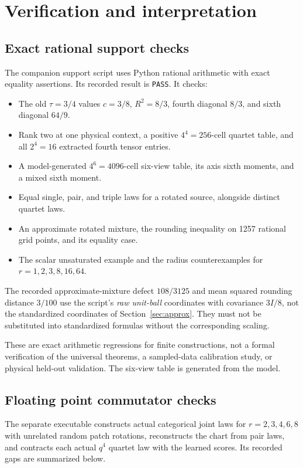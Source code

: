 \documentclass[11pt]{article}
\theoremstyle{definition}
\theoremstyle{remark}
\begin{document}
\section{Verification and interpretation}
\label{sec:verification}

\subsection{Exact rational support checks}

The companion support script uses Python rational arithmetic with exact
equality assertions. Its recorded result is \texttt{PASS}. It checks:
\begin{itemize}
\item The old $\tau=3/4$ values $c=3/8$, $R^2=8/3$, fourth diagonal
$8/3$, and sixth diagonal $64/9$.
\item Rank two at one physical context, a positive $4^4=256$-cell quartet
table, and all $2^4=16$ extracted fourth tensor entries.
\item A model-generated $4^6=4096$-cell six-view table, its axis sixth
moments, and a mixed sixth moment.
\item Equal single, pair, and triple laws for a rotated source, alongside
distinct quartet laws.
\item An approximate rotated mixture, the rounding inequality on 1257
rational grid points, and its equality case.
\item The scalar unsaturated example and the radius counterexamples for
$r=1,2,3,8,16,64$.
\end{itemize}
The recorded approximate-mixture defect $108/3125$ and mean squared
rounding distance $3/100$ use the script's \emph{raw unit-ball} coordinates
with covariance $3I/8$, not the standardized coordinates of
Section~\ref{sec:approx}. They must not be substituted into standardized
formulas without the corresponding scaling.

These are exact arithmetic regressions for finite constructions, not a
formal verification of the universal theorems, a sampled-data calibration
study, or physical held-out validation. The six-view table is generated
from the model.

\subsection{Floating point commutator checks}

The separate executable constructs actual categorical joint laws for
$r=2,3,4,6,8$ with unrelated random patch rotations, reconstructs the
chart from pair laws, and contracts each actual $q^4$ quartet law with
the learned scores. Its recorded gaps are summarized below.
\end{document}
